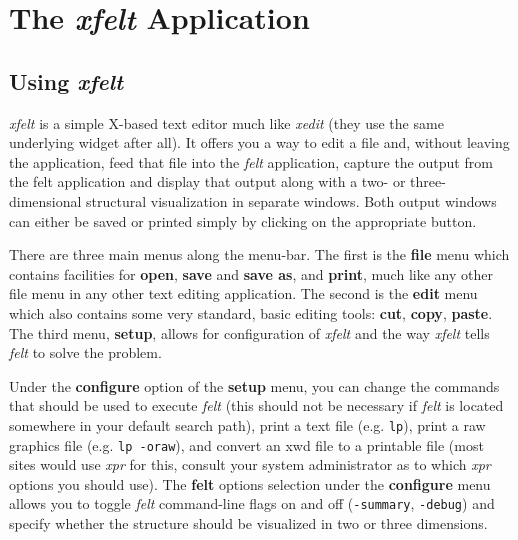
\newpage{\pagestyle{empty}\cleardoublepage}

\chapter{The {\em xfelt} Application}
\label{xfelt}

\section{Using {\em xfelt}}
\label{xfelt.using}

{\em xfelt} is a simple X-based text editor much like {\em xedit}
(they use the same 
underlying widget after all).  It offers you a way to edit a \felt{} file 
and, without leaving the application, feed that file into the {\em felt} 
application, capture the output from the felt application and display that 
output along with a two- or three-dimensional structural visualization in 
separate windows.  Both output windows can either be saved or printed simply 
by clicking on the appropriate button.	

There are three main menus along the menu-bar.  The first is the {\bf file} 
menu which contains facilities for {\bf open}, {\bf save} and {\bf save as}, 
and {\bf print}, much like any other file menu in any other text editing 
application.  The second is the {\bf edit} menu which also contains some very 
standard, basic editing tools: {\bf cut}, {\bf copy}, {\bf paste}.  The third 
menu, {\bf setup}, allows for configuration of {\em xfelt} and the way 
{\em xfelt} tells {\em felt} to solve the problem.	

Under the {\bf configure} option of the {\bf setup} menu, you can change
the commands that should be used to execute {\em felt} (this should not be
necessary if {\em felt} is located somewhere in your default search path), 
print a text file (e.g. {\tt lp}), print a raw graphics file 
(e.g. {\tt lp -oraw}), 
and convert an xwd file to a printable file (most sites would use {\em xpr} for 
this, consult your system administrator as to which {\em xpr} options you 
should use).  The {\bf felt} options selection under the {\bf configure}
menu allows 
you to toggle {\em felt} command-line flags on and off ({\tt -summary}, 
{\tt -debug}) and specify whether the structure should be visualized in two or 
three dimensions.  		

